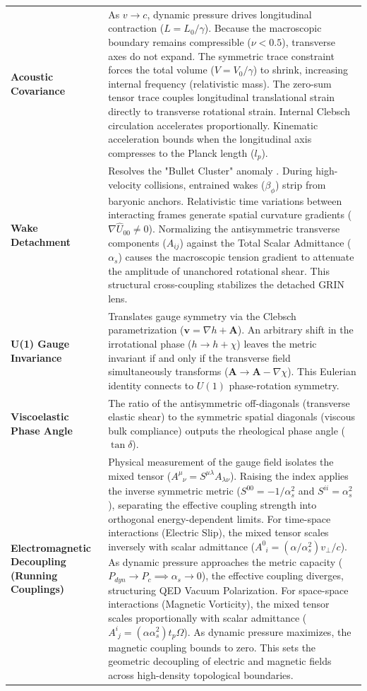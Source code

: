 \begin{longtable}{p{} p{}}
    \textbf{Acoustic Covariance} & As $v \to c$, dynamic pressure drives longitudinal contraction ($L = L_0/\gamma$). Because the macroscopic boundary remains compressible ($\nu < 0.5$), transverse axes do not expand. The symmetric trace constraint forces the total volume ($V = V_0/\gamma$) to shrink, increasing internal frequency (relativistic mass). The zero-sum tensor trace couples longitudinal translational strain directly to transverse rotational strain. Internal Clebsch circulation accelerates proportionally. Kinematic acceleration bounds when the longitudinal axis compresses to the Planck length ($l_p$). \\
    \textbf{Wake Detachment} & Resolves the "Bullet Cluster" anomaly \cite{Clowe2006}. During high-velocity collisions, entrained wakes ($\beta_\phi$) strip from baryonic anchors. Relativistic time variations between interacting frames generate spatial curvature gradients ($\nabla \hat{U}_{00} \neq 0$). Normalizing the antisymmetric transverse components ($A_{ij}$) against the Total Scalar Admittance ($\alpha_s$) causes the macroscopic tension gradient to attenuate the amplitude of unanchored rotational shear. This structural cross-coupling stabilizes the detached GRIN lens. \\
    \textbf{U(1) Gauge Invariance} & Translates gauge symmetry via the Clebsch parametrization ($\mathbf{v} = \nabla h + \mathbf{A}$). An arbitrary shift in the irrotational phase ($h \to h + \chi$) leaves the metric invariant if and only if the transverse field simultaneously transforms ($\mathbf{A} \to \mathbf{A} - \nabla \chi$). This Eulerian identity connects to $U(1)$ phase-rotation symmetry. \\ 
    \textbf{Viscoelastic Phase Angle} & The ratio of the antisymmetric off-diagonals (transverse elastic shear) to the symmetric spatial diagonals (viscous bulk compliance) outputs the rheological phase angle ($\tan \delta$). \\ 
    \textbf{Electromagnetic Decoupling (Running Couplings)} & Physical measurement of the gauge field isolates the mixed tensor ($A^\mu_{\phantom{\mu}\nu} = S^{\mu\lambda}A_{\lambda\nu}$). Raising the index applies the inverse symmetric metric ($S^{00} = -1/\alpha_s^2$ and $S^{ii} = \alpha_s^2$), separating the effective coupling strength into orthogonal energy-dependent limits. For time-space interactions (Electric Slip), the mixed tensor scales inversely with scalar admittance ($A^0_{\phantom{0}i} = (\alpha/\alpha_s^2) v_{\perp}/c$). As dynamic pressure approaches the metric capacity ($P_{dyn} \to P_c \implies \alpha_s \to 0$), the effective coupling diverges, structuring QED Vacuum Polarization. For space-space interactions (Magnetic Vorticity), the mixed tensor scales proportionally with scalar admittance ($A^i_{\phantom{i}j} = (\alpha \alpha_s^2) t_p \Omega$). As dynamic pressure maximizes, the magnetic coupling bounds to zero. This sets the geometric decoupling of electric and magnetic fields across high-density topological boundaries. \\ 

\end{longtable}
